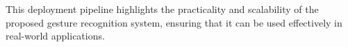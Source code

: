 \documentclass[10pt,twocolumn,letterpaper]{article}
\begin{document}
This deployment pipeline highlights the practicality and scalability of the proposed gesture recognition system, ensuring that it can be used effectively in real-world applications.







\end{document}
